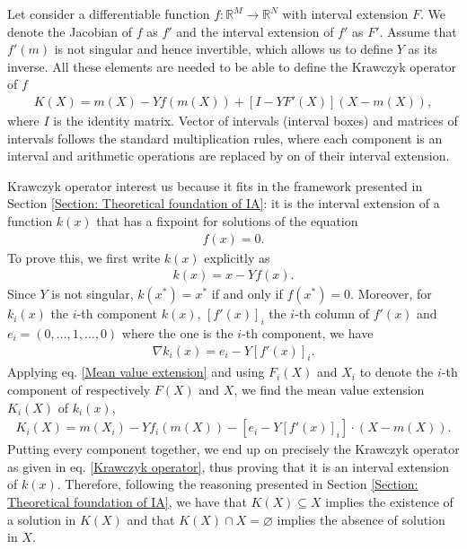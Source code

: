\documentclass[
11pt, %
english, %
singlespacing, %
nolistspacing, %
liststotoc, %
headsepline, %
]{MastersDoctoralThesis} %
\begin{document}
Let consider a differentiable function $f : \mathbb{R}^M \rightarrow \mathbb{R}^N$ with interval extension $F$. We denote the Jacobian of $f$ as $f'$ and the interval extension of $f'$ as $F'$. Assume that $f'(m)$ is not singular and hence invertible, which allows us to define $Y$ as its inverse. All these elements are needed to be able to define the Krawczyk operator of $f$
\begin{align}
	K(X) = m(X) - Y f(m(X)) + \left[I - Y F'(X)\right] (X - m(X)), \label{Krawczyk operator}
\end{align}
where $I$ is the identity matrix. Vector of intervals (interval boxes) and matrices of intervals follows the standard multiplication rules, where each component is an interval and arithmetic operations are replaced by on of their interval extension.

Krawczyk operator interest us because it fits in the framework presented in Section \ref{Section: Theoretical foundation of IA}: it is the interval extension of a function $k(x)$ that has a fixpoint for solutions of the equation
\begin{align}
	f(x) = 0. \label{Krawczyk general equation to zero}
\end{align}
To prove this, we first write $k(x)$ explicitly as
\begin{align}
	k(x) = x - Y f(x).
\end{align}
Since $Y$ is not singular, $k(x^*) = x^*$ if and only if $f(x^*) = 0$. Moreover, for $k_i(x)$ the $i$-th component $k(x)$, $\left[f'(x)\right]_i$ the $i$-th column of $f'(x)$ and $e_i = (0, \dots, 1, \dots, 0)$ where the one is the $i$-th component, we have
\begin{align}
	\nabla k_i(x) = e_i - Y \left[f'(x)\right]_i.
\end{align}
Applying eq. \eqref{Mean value extension} and using $F_i(X)$ and $X_i$ to denote the $i$-th component of respectively $F(X)$ and $X$, we find the mean value extension $K_i(X)$ of $k_i(x)$,
\begin{align}
	K_i(X) = m(X_i) - Y f_i(m(X)) - \left[e_i - Y \left[f'(x)\right]_i\right] \cdot (X - m(X)).
\end{align}
Putting every component together, we end up on precisely the Krawczyk operator as given in eq. \eqref{Krawczyk operator}, thus proving that it is an interval extension of $k(x)$. Therefore, following the reasoning presented in Section \ref{Section: Theoretical foundation of IA}, we have that $K(X) \subseteq X$ implies the existence of a solution in $K(X)$ and that $K(X) \cap X = \varnothing$ implies the absence of solution in $X$.
\end{document}
